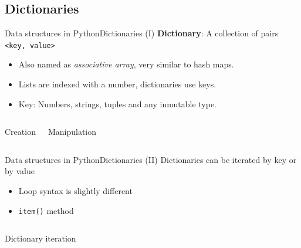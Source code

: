 \documentclass[10pt,compress]{beamer} %
\begin{document}
\subsection{Dictionaries}
\begin{frame}{Data structures in Python}{Dictionaries (I)}
	\textbf{Dictionary}: A collection of pairs \texttt{<key, value>}
		\begin{itemize}
		\item Also named as \textit{associative array}, very similar to hash maps.
		\item Lists are indexed with a number, dictionaries use keys.
		\item Key: Numbers, strings, tuples and any inmutable type.
		\end{itemize}

    \begin{columns}
		\begin{exampleblock}{Creation}
		\vspace{-0.2cm}
		
		\vspace{-0.2cm}
		\end{exampleblock}
		\vspace{0.7cm}

		\begin{exampleblock}{Manipulation}
		\vspace{-0.2cm}
		
		\vspace{-0.2cm}
		\end{exampleblock}

	\end{columns}
\end{frame}

\begin{frame}{Data structures in Python}{Dictionaries (II)}
	Dictionaries can be iterated by key or by value
		\begin{itemize}
		\item Loop syntax is slightly different
		\item \texttt{item()} method
		\end{itemize}

    \begin{columns}
		\begin{exampleblock}{Dictionary iteration}
		\vspace{-0.2cm}
		
		\vspace{-0.2cm}
		\end{exampleblock}
	\end{columns}
\end{frame}
\end{document}
